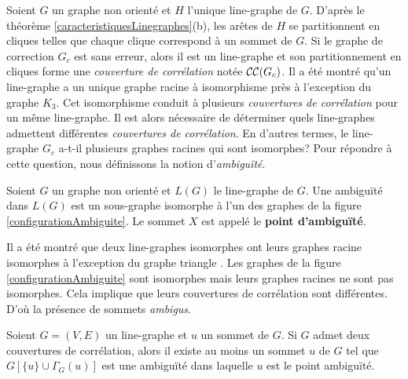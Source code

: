 Soient $G$ un graphe non orient\'e et $H$ l'unique  line-graphe de $G$.
D'apr\`es le th\'eor\`eme \ref{caracteristiquesLinegraphes}(b), les ar\^etes de $H$ se partitionnent en cliques telles que chaque clique correspond \`a un sommet de $G$. 
\newline
Si le graphe de correction $G_c$ est sans erreur, alors il est un line-graphe et son partitionnement en cliques forme une {\em couverture de corr\'elation} not\'ee ${\cal CC}(G_c)$. 
Il a \'et\'e montr\'e qu'un line-graphe a un unique graphe racine \`a isomorphisme pr\`es \cite{whitney1932congruent} \`a l'exception du graphe $K_3$.
Cet isomorphisme conduit \`a plusieurs {\em couvertures de corr\'elation} pour un m\^eme line-graphe. 
Il est alors n\'ecessaire de d\'eterminer quels line-graphes admettent diff\'erentes {\em couvertures de corr\'elation}. En d'autres termes, le line-graphe $G_c$ a-t-il plusieurs graphes racines qui sont isomorphes?
Pour r\'epondre \`a cette question, nous d\'efinissons la notion d'{\em ambigu\"{i}t\'e}. 
\newline

\begin{definition}
Soient $G$ un graphe non orient\'e et $L(G)$ le line-graphe de $G$. 
\newline
Une ambigu\"{i}t\'e dans $L(G)$ est un sous-graphe isomorphe \`a l'un des graphes de la figure \ref{configurationAmbiguite}. Le sommet $X$ est appel\'e le {\bf point d'ambigu\"{i}t\'e}.
\end{definition}

Il a \'et\'e montr\'e que deux line-graphes isomorphes ont leurs graphes racine isomorphes \`a l'exception du graphe triangle \cite{whitney1932congruent}. Les graphes de la figure \ref{configurationAmbiguite} sont isomorphes mais leurs graphes racines ne sont pas isomorphes. Cela implique que leurs couvertures de corr\'elation sont diff\'erentes. D'o\`u la pr\'esence de sommets {\em ambigus}.

\begin{lemma}
	Soient $G = (V,E)$ un line-graphe  et $u$ un sommet de $G$. 
	\newline
	Si $G$ admet deux couvertures de corr\'elation, alors il existe au moins un sommet $u$ de $G$ tel que $G[\{u\} \cup \Gamma_{G}(u)]$ est une ambigu\"{i}t\'e dans laquelle $u$ est le point ambigu\"{i}t\'e.
\end{lemma}
	
